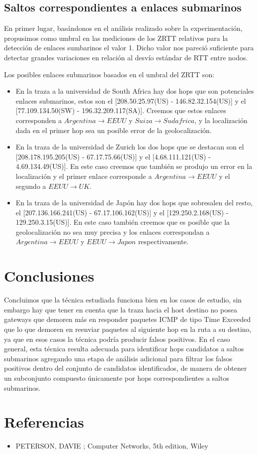 \documentclass[10pt, a4paper]{article}
\begin{document}
\subsection{Saltos correspondientes a enlaces submarinos}

En primer lugar, basándonos en el análisis realizado sobre la experimentación, propusimos como umbral en las mediciones de los ZRTT relativos para la detección de enlaces sumbarinos el valor 1. Dicho valor nos pareció suficiente para detectar grandes variaciones en relación al desvío estándar de RTT entre nodos.

Los posibles enlaces submarinos basados en el umbral del ZRTT son:
\begin{itemize}
\item En la traza a la universidad de South Africa hay dos hops que son potenciales enlaces submarinos, estos son el [208.50.25.97(US) - 146.82.32.154(US)] y el [77.109.134.50(SW) - 196.32.209.117(SA)]. Creemos que estos enlaces corresponden a $Argentina \rightarrow EEUU$ y $Suiza \rightarrow Sudafrica$, y la localización dada en el primer hop sea un posible error de la geolocalización.

\item En la traza de la universidad de Zurich los dos hops que se destacan son el [208.178.195.205(US) - 67.17.75.66(US)] y el [4.68.111.121(US) - 4.69.134.49(US)]. En este caso creemos que también se produjo un error en la localización y el primer enlace corresponde a $Argentina \rightarrow EEUU$  y el segundo a $EEUU \rightarrow UK$.

\item En la traza de la universidad de Japón hay dos hops que sobresalen del resto, el [207.136.166.241(US) - 67.17.106.162(US)] y el [129.250.2.168(US) - 129.250.3.15(US)]. En este caso también creemos que es posible que la geolocalización no sea muy precisa y los enlaces correspondan a $Argentina \rightarrow EEUU$ y $EEUU \rightarrow Japon$ respectivamente.
\end{itemize}

\section{Conclusiones}

Concluimos que la técnica estudiada funciona bien en los casos de estudio, sin embargo hay que tener en cuenta que la traza hacia el host destino no posea gateways que demoren más en responder paquetes ICMP de tipo Time Exceeded que lo que demoren en reenviar paquetes al siguiente hop en la ruta a su destino, ya que en esos casos la técnica podría producir falsos positivos.
En el caso general, esta técnica resulta adecuada para identificar hops candidatos a saltos submarinos agregando una etapa de análisis adicional para filtrar los falsos positivos dentro del conjunto de candidatos identificados, de manera de obtener un subconjunto compuesto únicamente por hops correspondientes a saltos submarinos.

\section{Referencias}
\begin{itemize}
\item PETERSON, DAVIE ; Computer Networks, 5th edition, Wiley


\end{itemize}
\end{document}
